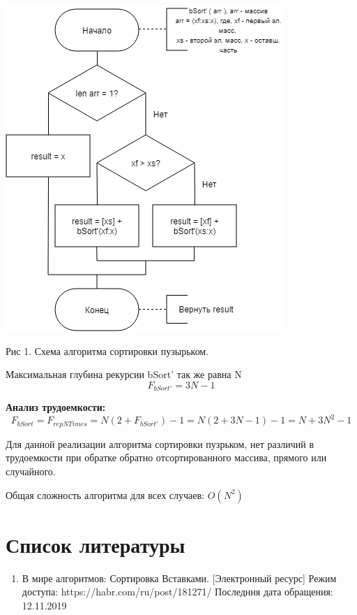 \documentclass[12pt]{report}
\begin{document}
\begin{minipage}{0.5\textwidth}
  \begin{flushleft}
	\includegraphics[scale=0.6]{bSort2.png}

	Рис 1. Схема алгоритма сортировки пузырьком.
  \end{flushleft}
\end{minipage}
\hfill
\begin{minipage}{0.5\textwidth}
  \begin{flushright}
	\begin{center}
		Максимальная глубина рекурсии bSort' так же равна N
		\begin{equation}
		F_{bSort'} = 3N - 1
		\end{equation}
	\end{center}
  \end{flushright}
\end{minipage}

\begin{center}
\textbf{Анализ трудоемкости:}
\begin{equation}
	F_{bSort} = F_{repNTimes} = N(2 + F_{bSort'}) - 1 = N(2 + 3N - 1) - 1 = N + 3N^2 - 1
\end{equation}

Для данной реализации алгоритма сортировки пузрьком, нет различий в трудоемкости при обратке обратно отсортированного массива, прямого или случайного.

Общая сложность алгоритма для всех случаев: {$O(N^2)$}
\end{center}








\chapter*{Список литературы}
\begin{enumerate} 
	\item В мире алгоритмов: Сортировка Вставками. [Электронный ресурс] Режим доступа: https://habr.com/ru/post/181271/ Последння дата обращения: 12.11.2019
\end{enumerate} 
\end{document}
